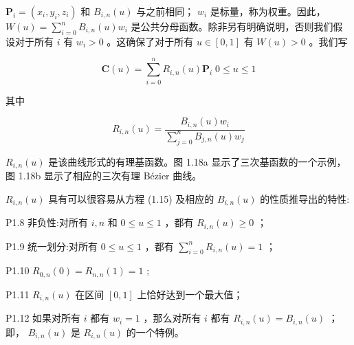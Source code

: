 \documentclass[../main.tex]{subfiles}
\begin{document}
\({\mathbf{P}}_{i} = \left( {{x}_{i},{y}_{i},{z}_{i}}\right)\) 和 \({B}_{i,n}\left( u\right)\) 与之前相同； \({w}_{i}\) 是标量，称为权重。因此， \(W\left( u\right)  = \mathop{\sum }\limits_{{i = 0}}^{n}{B}_{i,n}\left( u\right) {w}_{i}\) 是公共分母函数。除非另有明确说明，否则我们假设对于所有 \(i\) 有 \({w}_{i} > 0\) 。这确保了对于所有 \(u \in  \left\lbrack  {0,1}\right\rbrack\) 有 \(W\left( u\right)  > 0\) 。我们写

\[
\mathbf{C}\left( u\right)  = \mathop{\sum }\limits_{{i = 0}}^{n}{R}_{i,n}\left( u\right) {\mathbf{P}}_{i}\;0 \leq  u \leq  1 \tag{1.15}
\]

其中

\[
{R}_{i,n}\left( u\right)  = \frac{{B}_{i,n}\left( u\right) {w}_{i}}{\mathop{\sum }\limits_{{j = 0}}^{n}{B}_{j,n}\left( u\right) {w}_{j}}
\]

\noindent\begin{minipage}{\linewidth}
\({R}_{i,n}\left( u\right)\) 是该曲线形式的有理基函数。图 1.18a 显示了三次基函数的一个示例，图 1.18b 显示了相应的三次有理 Bézier 曲线。
\begin{center}
\begin{minipage}{16.4cm}
\centering
{}
\captionsetup{font=small,skip=6pt,justification=centering}
\end{minipage}
\end{center}
\end{minipage}
\par\medskip


\({R}_{i,n}\left( u\right)\) 具有可以很容易从方程 (1.15) 及相应的 \({B}_{i,n}\left( u\right)\) 的性质推导出的特性:

P1.8 非负性:对所有 \(i,n\) 和 \(0 \leq  u \leq  1\) ，都有 \({R}_{i,n}\left( u\right)  \geq  0\) ；

P1.9 统一划分:对所有 \(0 \leq  u \leq  1\) ，都有 \(\mathop{\sum }\limits_{{i = 0}}^{n}{R}_{i,n}\left( u\right)  = 1\) ；

P1.10 \({R}_{0,n}\left( 0\right)  = {R}_{n,n}\left( 1\right)  = 1\) ;

P1.11 \({R}_{i,n}\left( u\right)\) 在区间 \(\left\lbrack  {0,1}\right\rbrack\) 上恰好达到一个最大值；

P1.12 如果对所有 \(i\) 都有 \({w}_{i} = 1\) ，那么对所有 \(i\) 都有 \({R}_{i,n}\left( u\right)  = {B}_{i,n}\left( u\right)\) ；即， \({B}_{i,n}\left( u\right)\) 是 \({R}_{i,n}\left( u\right)\) 的一个特例。
\end{document}
